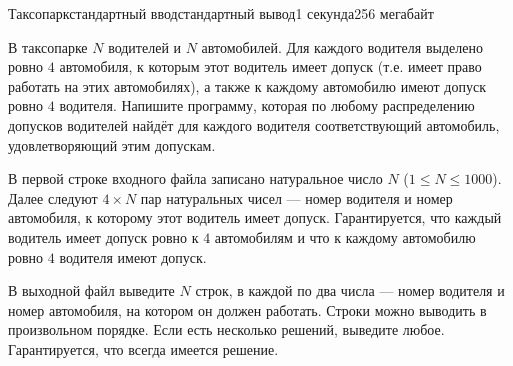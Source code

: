 \begin{problem}{Таксопарк}{стандартный ввод}{стандартный вывод}{1 секунда}{256 мегабайт}

В таксопарке $N$ водителей и $N$ автомобилей. Для каждого водителя выделено ровно $4$ автомобиля, к которым этот водитель имеет допуск (т.е. имеет право работать на этих автомобилях), а также к каждому автомобилю имеют допуск ровно $4$ водителя.
Напишите программу, которая по любому распределению допусков водителей найдёт для каждого водителя соответствующий автомобиль, удовлетворяющий этим допускам.


\InputFile
В первой строке входного файла записано натуральное число $N$ ($1 \le N \le 1000$). Далее следуют $4 \times N$ пар натуральных чисел --- номер водителя и номер автомобиля, к которому этот водитель имеет допуск.
Гарантируется, что каждый водитель имеет допуск ровно к $4$ автомобилям и что к каждому автомобилю ровно $4$ водителя имеют допуск.


\OutputFile
В выходной файл выведите $N$ строк, в каждой по два числа --- номер водителя и номер автомобиля, на котором он должен работать. Строки можно выводить в произвольном порядке. Если есть несколько решений, выведите любое. Гарантируется, что всегда имеется решение.
\newpage

\Example

\begin{example}
%
\end{example}

\end{problem}

